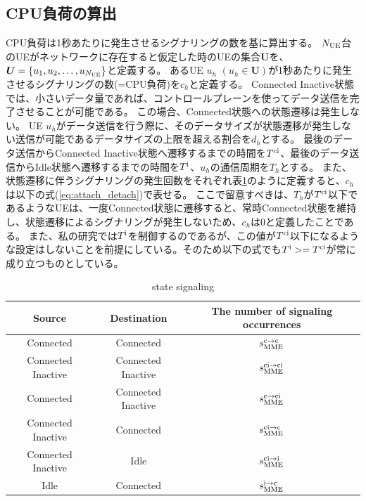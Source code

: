 \documentclass[a4j]{ujarticle}
\begin{document}
\subsection{CPU負荷の算出}
\label{sec:cpu}
CPU負荷は1秒あたりに発生させるシグナリングの数を基に算出する。
$N_{\rm UE}$台のUEがネットワークに存在すると仮定した時のUEの集合$\bm{U}$を、$\bm{U} = \left\{ u_1,u_2,\ldots,u_{N_{\rm UE}} \right\}$と定義する。
あるUE $u_h$ $(u_h \in \bm{U})$が1秒あたりに発生させるシグナリングの数(=CPU負荷)を$c_h$と定義する。
Connected Inactive状態では、小さいデータ量であれば、コントロールプレーンを使ってデータ送信を完了させることが可能である。
この場合、Connected状態への状態遷移は発生しない。
UE $u_h$がデータ送信を行う際に、そのデータサイズが状態遷移が発生しない送信が可能であるデータサイズの上限を超える割合を$d_h$とする。
最後のデータ送信からConnected Inactive状態へ遷移するまでの時間を$T^{\rm ci}$、最後のデータ送信からIdle状態へ遷移するまでの時間を$T^{\rm i}$、$u_h$の通信周期を$T_h$とする。
また、状態遷移に伴うシグナリングの発生回数をそれぞれ表\ref{table:state}のように定義すると、$c_h$は以下の式(\ref{eq:attach_detach})で表せる。
ここで留意すべきは、$T_h$が$T^{\rm ci}$以下であるようなUEは、一度Connected状態に遷移すると、常時Connected状態を維持し、状態遷移によるシグナリングが発生しないため、$c_h$は0と定義したことである。
また、私の研究では$T^{\rm i}$を制御するのであるが、この値が$T^{\rm ci}$以下になるような設定はしないことを前提にしている。そのため以下の式でも$T^{\rm i} >= T^{\rm ci}$が常に成り立つものとしている。
\begin{table}[h]
 \caption{state signaling}
 \label{table:state}
 \centering
  \begin{tabular}{ccc}
   \hline
   Source & Destination & The number of signaling occurrences \\
   \hline \hline
   Connected & Connected & $s_{\rm MME}^{\rm c \to \rm c}$ \\
   Connected Inactive & Connected Inactive & $s_{\rm MME}^{\rm ci \to \rm ci}$ \\
   Connected & Connected Inactive & $s_{\rm MME}^{\rm c \to \rm ci}$ \\
   Connected Inactive & Connected & $s_{\rm MME}^{\rm ci \to \rm c}$ \\
   Connected Inactive & Idle & $s_{\rm MME}^{\rm ci \to \rm i}$ \\
   Idle & Connected  & $s_{\rm MME}^{\rm i \to \rm c}$ \\
   \hline
  \end{tabular}
\end{table}
\end{document}
